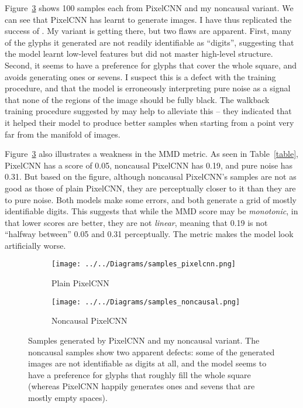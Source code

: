 \documentclass[11pt, a4paper, openany]{book}
\newcommand{\nquote}[1]{``{#1}''}
\begin{document}
Figure~\ref{samples} shows 100 samples each from PixelCNN and my noncausal variant. We can see that PixelCNN has learnt to generate images. I have thus replicated the success of \citet{pixelcnn1}. My variant is getting there, but two flaws are apparent. First, many of the glyphs it generated are not readily identifiable as \nquote{digits}, suggesting that the model learnt low-level features but did not master high-level structure. Second, it seems to have a preference for glyphs that cover the whole square, and avoids generating ones or sevens. I suspect this is a defect with the training procedure, and that the model is erroneously interpreting pure noise as a signal that none of the regions of the image should be fully black. The walkback training procedure suggested by \citet{denoisinggenerative} may help to alleviate this -- they indicated that it helped their model to produce better samples when starting from a point very far from the manifold of images.

Figure~\ref{samples} also illustrates a weakness in the MMD metric. As seen in Table~\ref{table}, PixelCNN has a score of 0.05, noncausal PixelCNN has 0.19, and pure noise has 0.31. But based on the figure, although noncausal PixelCNN's samples are not as good as those of plain PixelCNN, they are perceptually closer to it than they are to pure noise. Both models make some errors, and both generate a grid of mostly identifiable digits. This suggests that while the MMD score may be \emph{monotonic}, in that lower scores are better, they are not \emph{linear}, meaning that 0.19 is not \nquote{halfway between} 0.05 and 0.31 perceptually. The metric makes the model look artificially worse.


\begin{figure}
  \centering    
    \begin{subfigure}{0.46\columnwidth}
        \centering
        \caption{Plain PixelCNN}
        \texttt{[image: ../../Diagrams/samples\_pixelcnn.png]} 
        \label{samples:pixelcnn}
    \end{subfigure}
    \hfill
    \begin{subfigure}{0.46\columnwidth}
        \centering
        \caption{Noncausal PixelCNN}
        \texttt{[image: ../../Diagrams/samples\_noncausal.png]} 
        \label{samples:noncausal}
    \end{subfigure}
  \caption[Generated samples]{Samples generated by PixelCNN and my noncausal variant. The noncausal samples show two apparent defects: some of the generated images are not identifiable as digits at all, and the model seems to have a preference for glyphs that roughly fill the whole square (whereas PixelCNN happily generates ones and sevens that are mostly empty spaces).}
  \label{samples}
\end{figure}
\end{document}
